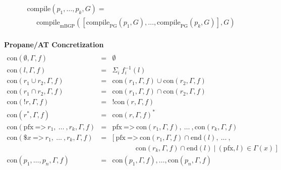 \documentclass[twocolumn, openany]{sig-alternate-10pt}
\newcommand{\Path}{\texttt{=>}}
\newcommand{\Con}{\mathrm{con}}
\newcommand{\Pfx}{\mathrm{pfx}}%
\newcommand{\Compile}{\ensuremath{\mathrm{compile}}}
\newcommand{\hdr}[2]{\flushleft \chdr{\hspace{5mm}#1}{#2}}
\newcommand{\chdr}[2]{\textbf{#1} {#2} \\ \centering}%
\begin{document}
\begin{figure*}[h!]
\begin{minipage}[t]{.5\linewidth}
\[\begin{array}{l}
     \Compile( p_1, \dots, p_k, G) = \\
     ~~~~~~ \text{compile}_\text{mBGP}([\text{compile}_\text{PG}(p_1,G), \dots, \text{compile}_\text{PG}(p_k,G)], G) \\
  \end{array} \]%
  \end{minipage}%

  \vspace{3em}

  \vspace*{-2\baselineskip}
  \begin{minipage}[t]{1.01\linewidth}
  \hdr{Propane/AT Concretization}{}
  \vspace*{-2\baselineskip}
  \[ \begin{array}{lcl}
     \\
     \Con(\emptyset, \Gamma, f)      &=& \emptyset \\
     \Con(l, \Gamma, f)              &=& \Sigma_i ~ f_i^{-1}(l) \\
     \Con(r_1 \cup r_2, \Gamma, f)   &=& \Con(r_1,\Gamma,f) \cup \Con(r_2,\Gamma,f) \\
     \Con(r_1 \cap r_2, \Gamma, f)   &=& \Con(r_1,\Gamma,f) \cap \Con(r_2,\Gamma,f) \\
     \Con(!r, \Gamma, f)             &=& !\Con(r,\Gamma,f) \\
     \Con(r^*, \Gamma, f)            &=& \Con(r,\Gamma,f)^* \\%
     \Con(\Pfx ~\Path~ r_1, ~\dots~, r_k, \Gamma, f) &=&
          \Pfx ~\Path~ \Con(r_1,\Gamma,f), ~\dots~, \Con(r_k,\Gamma,f)  \\%
     \Con(\$x ~\Path~ r_1, ~\dots~, r_k, \Gamma, f) &=&%
         [~ \Pfx ~\Path~ \Con(r_1,\Gamma,f) \cap \text{end}(l), ~\dots~, \\%
         & & ~~~~~~~~~~~~~~~ \Con(r_k,\Gamma,f) \cap \text{end}(l) ~\vert~ (\Pfx,l) \in \Gamma(x) ~]  \\%
     \Con(p_1, \dots, p_n, \Gamma,f) &=& \Con(p_1, \Gamma,f), \dots, \Con(p_n, \Gamma,f) \\%

  \end{array} \]%
  \end{minipage}%

  \vspace{2em}


\end{figure*}
\end{document}
